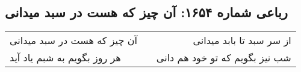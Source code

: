 \begin{center}
\section*{رباعی شماره ۱۶۵۴: آن چیز که هست در سبد میدانی}
\label{sec:1654}
\begin{longtable}{l p{0.5cm} r}
آن چیز که هست در سبد میدانی
&&
از سر سبد تا بابد میدانی
\\
هر روز بگویم به شبم یاد آید
&&
شب نیز بگویم که تو خود هم دانی
\\
\end{longtable}
\end{center}
